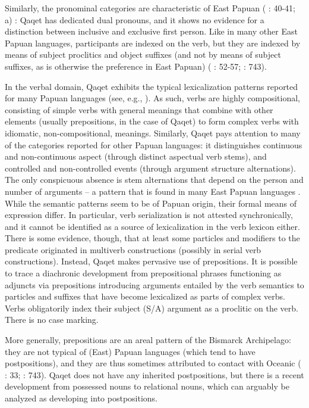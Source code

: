 \documentclass[a4paper, 11pt]{book}
\begin{document}
Similarly, the pronominal categories are characteristic of East Papuan
(\citeauthor{dunn2002east} \citeyear{dunn2002east}: 40-41;
\citeauthor{stebbins2009papuan} \citeyear{stebbins2009papuan}a)
: Qaqet has dedicated dual pronouns, and it shows no evidence for a distinction between inclusive and exclusive first person. Like in many other East Papuan languages, participants are indexed on the verb, but they are indexed by means of subject proclitics and object suffixes (and not by means of subject suffixes, as is otherwise the preference in East Papuan)
(\citeauthor{dunn2002east} \citeyear{dunn2002east}: 52-57; \citeauthor{dunn2008structural} \citeyear{dunn2008structural}: 743).

 
In the verbal domain, Qaqet exhibits the typical lexicalization patterns reported for many Papuan languages (see, e.g., \citet{foley1986papuan}).
As such, verbs are highly compositional, consisting of simple verbs with general meanings that combine with other elements (usually prepositions, in the case of Qaqet) to form complex verbs with idiomatic, non-compositional, meanings. Similarly, Qaqet pays attention to many of the categories reported for other Papuan languages: it distinguishes continuous and non-continuous aspect (through distinct aspectual verb stems), and controlled and non-controlled events (through argument structure alternations). The only conspicuous absence is stem alternations that depend on the person and number of arguments – a pattern that is found in many East Papuan languages \citep[38-57]{dunn2002east}.
While the semantic patterns seem to be of Papuan origin, their formal means of expression differ. In particular, verb serialization is not attested synchronically, and it cannot be identified as a source of lexicalization in the verb lexicon either. There is some evidence, though, that at least some particles and modifiers to the predicate originated in multiverb constructions (possibly in serial verb constructions). Instead, Qaqet makes pervasive use of prepositions. It is possible to trace a diachronic development from prepositional phrases functioning as adjuncts via prepositions introducing arguments entailed by the verb semantics to particles and suffixes that have become lexicalized as parts of complex verbs.
Verbs obligatorily index their subject (S/A) argument as a proclitic on the verb.  There is no case marking. 

More generally, prepositions are an areal pattern of the Bismarck Archipelago: they are not typical of (East) Papuan languages (which tend to have postpositions), and they are thus sometimes attributed to contact with Oceanic
(\citeauthor{dunn2002east} \citeyear{dunn2002east}: 33;
\citeauthor{dunn2008structural} \citeyear{dunn2008structural}: 743). Qaqet does not have any inherited postpositions, but there is a recent development from possessed nouns to relational nouns, which can arguably be analyzed as developing into postpositions.
\end{document}
